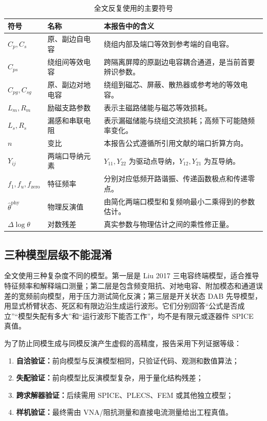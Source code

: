\documentclass[UTF8,a4paper,12pt]{ctexart}
\begin{document}
\begin{table}[H]
\centering
\caption{全文反复使用的主要符号}
\begin{tabularx}{\textwidth}{p{}p{}X}
\toprule
符号 & 名称 & 本报告中的含义 \\
\midrule
$C_p,C_s$ & 原、副边自电容 & 绕组内部及端口等效到参考端的自电容。\\
$C_{ps}$ & 绕组间等效电容 & 跨隔离屏障的原副边电容耦合通道，是当前首要辨识参数。\\
$C_{pg},C_{sg}$ & 原、副边对地电容 & 绕组到磁芯、屏蔽、散热器或参考地的等效电容。\\
$L_m,R_m$ & 励磁支路参数 & 表示主磁路储能与磁芯等效损耗。\\
$L_s,R_s$ & 漏感和串联电阻 & 表示漏磁储能与绕组交流损耗；高频下可能随频率变化。\\
$n$ & 变比 & 本报告公式遵循所引用文献的端口折算方向。\\
$Y_{ij}$ & 两端口导纳元素 & $Y_{11},Y_{22}$ 为驱动点导纳，$Y_{12},Y_{21}$ 为互导纳。\\
$f_1,f_u,f_{\mathrm{zero}}$ & 特征频率 & 分别对应低频开路谐振、传递函数极点和传递零点。\\
$\hat{\theta}^{\mathrm{phy}}$ & 物理反演值 & 由简化两端口模型和复频响最小二乘得到的参数估计。\\
$\Delta\log\theta$ & 对数残差 & 真实参数与物理估计之间的乘性修正量。\\
\bottomrule
\end{tabularx}
\end{table}

\subsection{三种模型层级不能混淆}

全文使用三种复杂度不同的模型。第一层是 Liu 2017 三电容终端模型，适合推导特征频率和解释端口测量；第二层是包含频变阻抗、对地电容、附加模态和通道误差的宽频前向模型，用于压力测试简化反演；第三层是开关状态 DAB 先导模型，用显式桥臂状态、死区和有限边沿生成运行波形。它们分别回答“公式是否成立”“模型失配有多大”和“运行波形下能否工作”，均不是有限元或逐器件 SPICE 真值。

为了防止同模生成与同模反演产生虚假的高精度，报告采用下列证据等级：
\begin{enumerate}
  \item \textbf{自洽验证：}前向模型与反演模型相同，只验证代码、观测和数值算法；
  \item \textbf{失配验证：}前向模型比反演模型复杂，用于量化结构残差；
  \item \textbf{跨求解器验证：}后续需用 SPICE、PLECS、FEM 或其他独立模型；
  \item \textbf{样机验证：}最终需由 VNA/阻抗测量和直接电流测量给出工程真值。
\end{enumerate}
\end{document}
